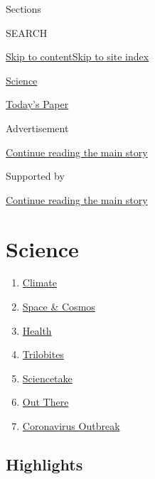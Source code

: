 Sections

SEARCH

\protect\hyperlink{site-content}{Skip to
content}\protect\hyperlink{site-index}{Skip to site index}

\href{https://www.nytimes.com/section/science}{Science}

\href{https://myaccount.nytimes.com/auth/login?response_type=cookie\&client_id=vi}{}

\href{https://www.nytimes.com/section/todayspaper}{Today's Paper}

Advertisement

\protect\hyperlink{after-top}{Continue reading the main story}

Supported by

\protect\hyperlink{after-sponsor}{Continue reading the main story}

\hypertarget{science}{%
\section{Science}\label{science}}

\begin{enumerate}
\def\labelenumi{\arabic{enumi}.}
\tightlist
\item
  \href{/section/climate}{Climate}
\item
  \href{/section/science/space}{Space \& Cosmos}
\item
  \href{/section/health}{Health}
\item
  \href{/column/trilobites}{Trilobites}
\item
  \href{/column/sciencetake}{Sciencetake}
\item
  \href{/column/out-there}{Out There}
\item
  \href{/news-event/coronavirus}{Coronavirus Outbreak}
\end{enumerate}

\hypertarget{highlights}{%
\subsection{Highlights}\label{highlights}}

